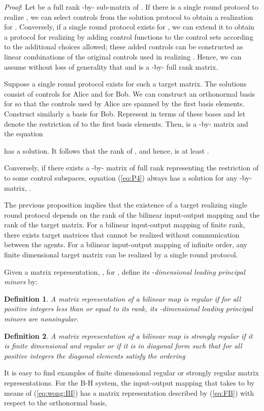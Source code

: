 \documentclass[12pt,onecolumn,draftcls]{IEEEtran}
\newtheorem{definition}{Definition}[section]
\begin{document}
\noindent
\textit{Proof}: Let  be a full rank -by- sub-matrix of . 
If there is a single round protocol to realize , we can select controls from the solution protocol
to obtain a realization for .  Conversely, if a single round protocol exists for ,
we can extend it to obtain a protocol for realizing  by adding control functions to the
control sets according to the additional choices allowed; these added controls can be constructed as
linear combinations of the original controls used in realizing .  
Hence, we can assume without loss
of generality that  and  is a -by- full rank matrix.

Suppose a single round protocol exists for such a target matrix.  The solutions consist of
 controls for Alice and  for Bob.  We can construct an orthonormal basis for
 so that the controls used by Alice are spanned
by the first  basis elements.   Construct similarly a basis for Bob.
Represent  in terms of these bases and let 
denote the restriction of  to the first  basis elements.
Then,  is a -by- matrix and the equation

has a solution.  It follows that the rank of , and hence,  is at least .

Conversely, if there exists a -by- matrix  of full rank representing the
restriction of  to some control subspaces, equation (\ref{eq:P4}) always has a solution for
any -by- matrix, .			\hfill 

\vspace{.5cm}

The previous proposition implies that the existence of a target realizing single round protocol
depends on the rank of the bilinear input-output mapping and the rank of the target matrix.  
For a bilinear input-output mapping of finite rank,
there exists target matrices that cannot be realized without communication between the agents.
For a bilinear input-output mapping of infinite order, any finite dimensional target matrix can be
realized by a single round protocol.   

Given a matrix representation, , for ,
define its -{\em dimensional leading principal minors} by:


\begin{definition}
A matrix representation of a bilinear map is {\it regular} if 
for all positive integers  less than or equal to its rank, its -dimensional leading principal minors are nonsingular.
\end{definition}

\begin{definition}
A matrix representation of a bilinear map is {\it strongly regular} if it is finite
dimensional and regular or if it is in
diagonal form such that for all positive integers 
the diagonal elements satisfy the ordering

\end{definition}
It is easy to find examples of finite dimensional regular or strongly regular
matrix representations.  For the B-H system, the input-output mapping that takes  to  by means of
(\ref{eq:wong:BI}) has a matrix representation  described by (\ref{eq:FB})
with respect to the orthonormal basis,
\end{document}
